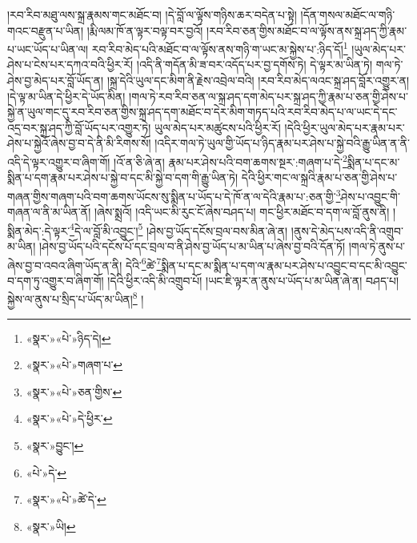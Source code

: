 །རབ་རིབ་མཐུ་ལས་སྐྲ་རྣམས་གང་མཐོང་བ། །དེ་བློ་ལ་ལྟོས་གཉིས་ཆར་བདེན་པ་སྟེ། །དོན་གསལ་མཐོང་ལ་གཉི་གའང་བརྫུན་པ་ཡིན། །རྨི་ལམ་ཁོ་ན་ལྟར་བལྟ་བར་བྱའོ། །རབ་རིབ་ཅན་གྱིས་མཐོང་བ་ལ་ལྟོས་ནས་སྐྲ་ཤད་ཀྱི་རྣམ་པ་ཡང་ཡོད་པ་ཡིན་ལ། རབ་རིབ་མེད་པའི་མཐོང་བ་ལ་ལྟོས་ནས་གཉི་ག་ཡང་མ་སྐྱེས་པ་:ཉིད་དོ།\footnote{«སྣར་»«པེ་»ཉིད་དེ།} །ཡུལ་མེད་པར་ཤེས་པ་ངེས་པར་དཀའ་བའི་ཕྱིར་རོ། །འདི་ནི་གདོན་མི་ཟ་བར་འདོད་པར་བྱ་དགོས་ཏེ། དེ་ལྟར་མ་ཡིན་ཏེ། གལ་ཏེ་ཤེས་བྱ་མེད་པར་བློ་ཡོད་ན། །སྐྲ་དེའི་ཡུལ་དང་མིག་ནི་རྗེས་འབྲེལ་བའི། །རབ་རིབ་མེད་ལའང་སྐྲ་ཤད་བློར་འགྱུར་ན། །དེ་ལྟ་མ་ཡིན་དེ་ཕྱིར་དེ་ཡོད་མིན། །གལ་ཏེ་རབ་རིབ་ཅན་ལ་སྐྲ་ཤད་དག་མེད་པར་སྐྲ་ཤད་ཀྱི་རྣམ་པ་ཅན་གྱི་ཤེས་པ་སྐྱེ་ན་ཡུལ་གང་དུ་རབ་རིབ་ཅན་གྱིས་སྐྲ་ཤད་དག་མཐོང་བ་དེར་མིག་གཏད་པའི་རབ་རིབ་མེད་པ་ལ་ཡང་དེ་དང་འདྲ་བར་སྐྲ་ཤད་ཀྱི་བློ་ཡོད་པར་འགྱུར་ཏེ། ཡུལ་མེད་པར་མཚུངས་པའི་ཕྱིར་རོ། །དེའི་ཕྱིར་ཡུལ་མེད་པར་རྣམ་པར་ཤེས་པ་སྐྱེའོ་ཞེས་བྱ་བ་དེ་ནི་མི་རིགས་སོ། །འདིར་གལ་ཏེ་ཡུལ་གྱི་ཡོད་པ་ཉིད་རྣམ་པར་ཤེས་པ་སྐྱེ་བའི་རྒྱུ་ཡིན་ན་ནི་འདི་དེ་ལྟར་འགྱུར་བ་ཞིག་གོ། །འོ་ན་ཅི་ཞེ་ན། རྣམ་པར་ཤེས་པའི་བག་ཆགས་སྔར་:གཞག་པ་དེ་\footnote{«སྣར་»«པེ་»གཞག་པ་}སྨིན་པ་དང་མ་སྨིན་པ་དག་རྣམ་པར་ཤེས་པ་སྐྱེ་བ་དང་མི་སྐྱེ་བ་དག་གི་རྒྱུ་ཡིན་ཏེ། དེའི་ཕྱིར་གང་ལ་སྐྲའི་རྣམ་པ་ཅན་གྱི་ཤེས་པ་གཞན་གྱིས་གཞག་པའི་བག་ཆགས་ཡོངས་སུ་སྨིན་པ་ཡོད་པ་དེ་ཁོ་ན་ལ་དེའི་རྣམ་པ་:ཅན་གྱི་\footnote{«སྣར་»«པེ་»ཅན་གྱིས་}ཤེས་པ་འབྱུང་གི་གཞན་ལ་ནི་མ་ཡིན་ནོ། །ཞེས་སྨྲའོ། །འདི་ཡང་མི་རུང་ངོ་ཞེས་བཤད་པ། གང་ཕྱིར་མཐོང་བ་དག་ལ་བློ་ནུས་ནི། །སྨིན་མེད་:དེ་ལྟར་\footnote{«སྣར་»«པེ་»དེ་ཕྱིར་}དེ་ལ་བློ་མི་འབྱུང་།\footnote{«སྣར་»བྱུང་།} །ཤེས་བྱ་ཡོད་དངོས་བྲལ་བས་མིན་ཞེ་ན། །ནུས་དེ་མེད་པས་འདི་ནི་འགྲུབ་མ་ཡིན། །ཤེས་བྱ་ཡོད་པའི་དངོས་པོ་དང་བྲལ་བ་ནི་ཤེས་བྱ་ཡོད་པ་མ་ཡིན་པ་ཞེས་བྱ་བའི་དོན་ཏོ། །གལ་ཏེ་ནུས་པ་ཞེས་བྱ་བ་འབའ་ཞིག་ཡོད་ན་ནི། དེའི་\footnote{«པེ་»དེ་}ཚེ་\footnote{«སྣར་»«པེ་»ཚེ་དེ་}སྨིན་པ་དང་མ་སྨིན་པ་དག་ལ་རྣམ་པར་ཤེས་པ་འབྱུང་བ་དང་མི་འབྱུང་བ་དག་ཏུ་འགྱུར་བ་ཞིག་གོ། །དེའི་ཕྱིར་འདི་མི་འགྲུབ་པོ། །ཡང་ཇི་ལྟར་ན་ནུས་པ་ཡོད་པ་མ་ཡིན་ཞེ་ན། བཤད་པ། སྐྱེས་ལ་ནུས་པ་སྲིད་པ་ཡོད་མ་ཡིན།\footnote{«སྣར་»ཡི།} །
